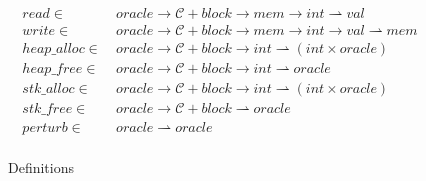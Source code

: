 \documentclass{article}
\begin{document}
\begin{figure}
\begin{minipage}[t]{0.49\textwidth}
  \end{minipage}
    \[\begin{split}
    \mathit{read} \in ~ & \mathit{oracle} \rightarrow \mathcal{C} + \mathit{block}
    \rightarrow \mathit{mem} \rightarrow \mathit{int} \rightharpoonup \mathit{val} \\
    \mathit{write} \in ~ & \mathit{oracle} \rightarrow \mathcal{C} + \mathit{block}
    \rightarrow \mathit{mem} \rightarrow \mathit{int} \rightarrow \mathit{val} \rightharpoonup
    \mathit{mem} \\
    \mathit{heap\_alloc} \in ~ & \mathit{oracle} \rightarrow
    \mathcal{C} + \mathit{block} \rightarrow
    \mathit{int} \rightharpoonup (\mathit{int} \times \mathit{oracle}) \\
    \mathit{heap\_free} \in ~ & \mathit{oracle} \rightarrow
    \mathcal{C}+\mathit{block} \rightarrow \mathit{int} \rightharpoonup
    \mathit{oracle} \\
    \mathit{stk\_alloc} \in ~ & \mathit{oracle} \rightarrow
    \mathcal{C} + \mathit{block} \rightarrow
    \mathit{int} \rightharpoonup (\mathit{int} \times \mathit{oracle}) \\
    \mathit{stk\_free} \in ~ & \mathit{oracle} \rightarrow \mathcal{C}+\mathit{block}
    \rightharpoonup \mathit{oracle} \\
    \mathit{perturb} \in ~ & \mathit{oracle} \rightharpoonup \mathit{oracle} \\
    \end{split}\]

    \caption{Definitions}
    \label{subfig:defs}
  \label{fig:memmod}
\end{figure}
\end{document}
